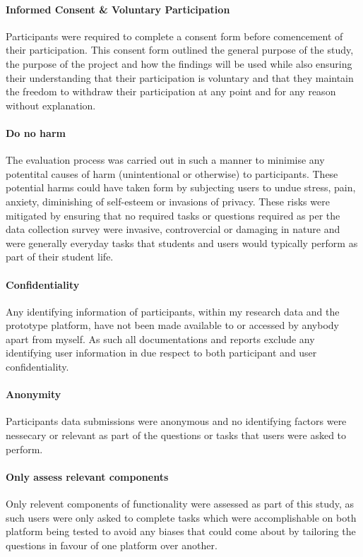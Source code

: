 \documentclass[lettersize,journal]{IEEEtran}
\begin{document}
		\paragraph{Informed Consent \& Voluntary Participation}

		Participants were required to complete a consent form before comencement of their participation. This consent form outlined the general purpose
		of the study, the purpose of the project and how the findings will be used while also ensuring their understanding that their participation is
		voluntary and that they maintain the freedom to withdraw their participation at any point and for any reason without explanation.
       
      		 \paragraph{Do no harm}
       		The evaluation process was carried out in such a manner to minimise any potentital causes of harm (unintentional or otherwise) to participants.
		These potential harms could have taken form by subjecting users to undue stress, pain, anxiety, diminishing of self-esteem or invasions of privacy.
		These risks were mitigated by ensuring that no required tasks or questions required as per the data collection survey were invasive, controvercial
		or damaging in nature and were generally everyday tasks that students and users would typically perform as part of their student life.

		\paragraph{Confidentiality}
		Any identifying information of participants, within my research data and the prototype platform, have not been made available to or accessed
		by anybody apart from myself. As such all documentations and reports exclude any identifying user information in due respect to both participant
		and user confidentiality.

       		\paragraph{Anonymity}

       		Participants data submissions were anonymous and no identifying factors were nessecary or relevant as part of the questions or tasks that users 
		were asked to perform.

		\paragraph{Only assess relevant components}
		Only relevent components of functionality were assessed as part of this study, as such users were only asked to complete tasks which were
		accomplishable on both platform being tested to avoid any biases that could come about by tailoring the questions in favour of one platform over 
		another.                
\end{document}
